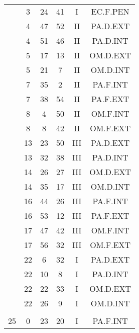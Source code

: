 \documentclass[12pt, a4paper]{article}
\begin{document}
\begin{multicols}{3}
{\begin{tabular}{c c c c c c}
	 	 	 	 & 3 & 24 & 41 & I & EC.F.PEN\\%
	 	 	 	 & 4 & 47 & 52 & II & PA.D.EXT\\%
	 	 	 	 & 4 & 51 & 46 & II & PA.D.INT\\%
	 	 	 	 & 5 & 17 & 13 & II & OM.D.EXT\\%
	 	 	 	 & 5 & 21 & 7 & II & OM.D.INT\\%
	 	 	 	 & 7 & 35 & 2 & II & PA.F.INT\\%
	 	 	 	 & 7 & 38 & 54 & II & PA.F.EXT\\%
	 	 	 	 & 8 & 4 & 50 & II & OM.F.INT\\%
	 	 	 	 & 8 & 8 & 42 & II & OM.F.EXT\\%
	 	 	 	 & 13 & 23 & 50 & III & PA.D.EXT\\%
	 	 	 	 & 13 & 32 & 38 & III & PA.D.INT\\%
	 	 	 	 & 14 & 26 & 27 & III & OM.D.EXT\\%
	 	 	 	 & 14 & 35 & 17 & III & OM.D.INT\\%
	 	 	 	 & 16 & 44 & 26 & III & PA.F.INT\\%
	 	 	 	 & 16 & 53 & 12 & III & PA.F.EXT\\%
	 	 	 	 & 17 & 47 & 42 & III & OM.F.INT\\%
	 	 	 	 & 17 & 56 & 32 & III & OM.F.EXT\\%
	 	 	 	 & 22 & 6 & 32 & I & PA.D.EXT\\%
	 	 	 	 & 22 & 10 & 8 & I & PA.D.INT\\%
	 	 	 	 & 22 & 22 & 33 & I & OM.D.EXT\\%
	 	 	 	 & 22 & 26 & 9 & I & OM.D.INT\\%
	 	 	 	 & & & & & \\%
	 	 	 	25 & 0 & 23 & 20 & I & PA.F.INT\\%

\end{tabular}}
\end{multicols}
\end{document}
